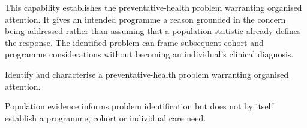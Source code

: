 This capability establishes the preventative-health problem warranting organised attention. It gives an intended programme a reason grounded in the concern being addressed rather than assuming that a population statistic already defines the response. The identified problem can frame subsequent cohort and programme considerations without becoming an individual's clinical diagnosis.



Identify and characterise a preventative-health problem warranting organised attention.



Population evidence informs problem identification but does not by itself establish a programme, cohort or individual care need.


